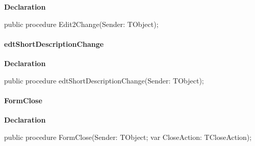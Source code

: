 \documentclass{report}
\newif\ifpdf
\begin{document}
\label{prjwizard.TfrmProjectWizard-Edit2Change}
\begin{list}{}{
\setlength{\itemindent}{0cm}
\setlength{\listparindent}{0cm}
\setlength{\leftmargin}{\evensidemargin}
\addtolength{\leftmargin}{\tmplength}
\settowidth{\labelsep}{X}
\addtolength{\leftmargin}{\labelsep}
\setlength{\labelwidth}{\tmplength}
}
\item[\textbf{Declaration}\hfill]
\ifpdf
\begin{flushleft}
\fi
\begin{ttfamily}
public procedure Edit2Change(Sender: TObject);\end{ttfamily}

\ifpdf
\end{flushleft}
\fi

\end{list}
\paragraph*{edtShortDescriptionChange}\hspace*{\fill}

\label{prjwizard.TfrmProjectWizard-edtShortDescriptionChange}
\begin{list}{}{
\setlength{\itemindent}{0cm}
\setlength{\listparindent}{0cm}
\setlength{\leftmargin}{\evensidemargin}
\addtolength{\leftmargin}{\tmplength}
\settowidth{\labelsep}{X}
\addtolength{\leftmargin}{\labelsep}
\setlength{\labelwidth}{\tmplength}
}
\item[\textbf{Declaration}\hfill]
\ifpdf
\begin{flushleft}
\fi
\begin{ttfamily}
public procedure edtShortDescriptionChange(Sender: TObject);\end{ttfamily}

\ifpdf
\end{flushleft}
\fi

\end{list}
\paragraph*{FormClose}\hspace*{\fill}

\label{prjwizard.TfrmProjectWizard-FormClose}
\begin{list}{}{
\setlength{\itemindent}{0cm}
\setlength{\listparindent}{0cm}
\setlength{\leftmargin}{\evensidemargin}
\addtolength{\leftmargin}{\tmplength}
\settowidth{\labelsep}{X}
\addtolength{\leftmargin}{\labelsep}
\setlength{\labelwidth}{\tmplength}
}
\item[\textbf{Declaration}\hfill]
\ifpdf
\begin{flushleft}
\fi
\begin{ttfamily}
public procedure FormClose(Sender: TObject; var CloseAction: TCloseAction);\end{ttfamily}

\ifpdf
\end{flushleft}
\fi

\end{list}
\end{document}
